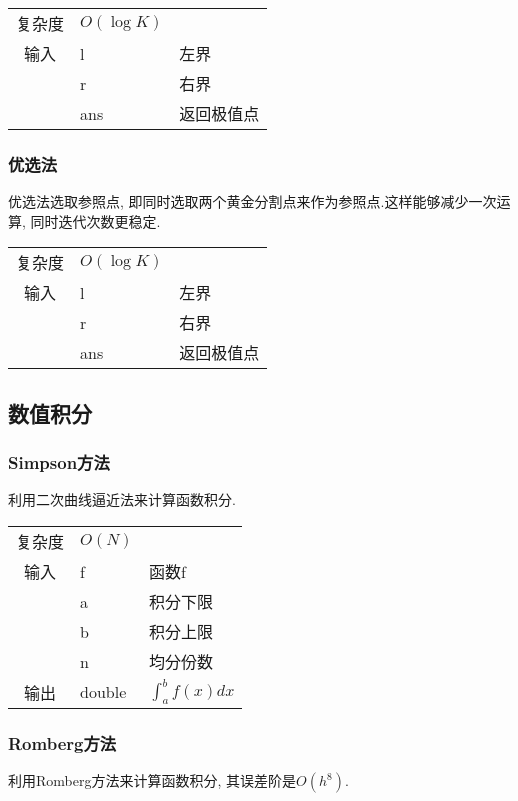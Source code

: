 \begin{longtable}{|c|l|l|}
复杂度 & $O(\log K)$ &  \\
输入 & l & 左界 \\
 & r & 右界 \\
 & ans & 返回极值点 \\ 
\end{longtable}



        \subsubsection{优选法}\small
优选法选取参照点, 即同时选取两个黄金分割点来作为参照点.这样能够减少一次运
算, 同时迭代次数更稳定.

\begin{longtable}{|c|l|l|}
复杂度 & $O(\log K)$ &  \\
输入 & l & 左界 \\
 & r & 右界 \\
 & ans & 返回极值点 \\ 
\end{longtable}



    \subsection{数值积分}\small
        \subsubsection{Simpson方法}\small
利用二次曲线逼近法来计算函数积分.

\begin{longtable}{|c|l|l|}
复杂度 & $O(N)$ &  \\
输入 & f & 函数f \\
 & a & 积分下限 \\
 & b & 积分上限 \\
 & n & 均分份数 \\ 
输出 & double & $\int_{a} ^{b} f(x)  dx$ \\ 
\end{longtable}



        \subsubsection{Romberg方法}\small
利用Romberg方法来计算函数积分, 其误差阶是$O(h^8)$.

